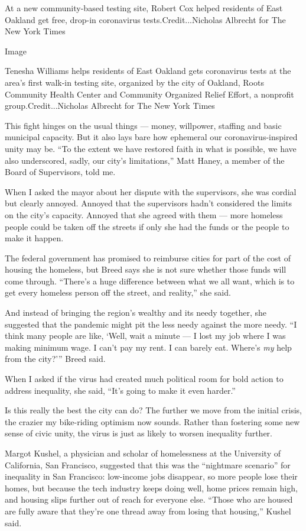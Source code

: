 At a new community-based testing site, Robert Cox helped residents of
East Oakland get free, drop-in coronavirus tests.Credit...Nicholas
Albrecht for The New York Times

Image

Tenesha Williams helps residents of East Oakland gets coronavirus tests
at the area's first walk-in testing site, organized by the city of
Oakland, Roots Community Health Center and Community Organized Relief
Effort, a nonprofit group.Credit...Nicholas Albrecht for The New York
Times

This fight hinges on the usual things --- money, willpower, staffing and
basic municipal capacity. But it also lays bare how ephemeral our
coronavirus-inspired unity may be. ``To the extent we have restored
faith in what is possible, we have also underscored, sadly, our city's
limitations,'' Matt Haney, a member of the Board of Supervisors, told
me.

When I asked the mayor about her dispute with the supervisors, she was
cordial but clearly annoyed. Annoyed that the supervisors hadn't
considered the limits on the city's capacity. Annoyed that she agreed
with them --- more homeless people could be taken off the streets if
only she had the funds or the people to make it happen.

The federal government has promised to reimburse cities for part of the
cost of housing the homeless, but Breed says she is not sure whether
those funds will come through. ``There's a huge difference between what
we all want, which is to get every homeless person off the street, and
reality,'' she said.

And instead of bringing the region's wealthy and its needy together, she
suggested that the pandemic might pit the less needy against the more
needy. ``I think many people are like, `Well, wait a minute --- I lost
my job where I was making minimum wage. I can't pay my rent. I can
barely eat. Where's \emph{my} help from the city?''' Breed said.

When I asked if the virus had created much political room for bold
action to address inequality, she said, ``It's going to make it even
harder.''

Is this really the best the city can do? The further we move from the
initial crisis, the crazier my bike-riding optimism now sounds. Rather
than fostering some new sense of civic unity, the virus is just as
likely to worsen inequality further.

Margot Kushel, a physician and scholar of homelessness at the University
of California, San Francisco, suggested that this was the ``nightmare
scenario'' for inequality in San Francisco: low-income jobs disappear,
so more people lose their homes, but because the tech industry keeps
doing well, home prices remain high, and housing slips further out of
reach for everyone else. ``Those who are housed are fully aware that
they're one thread away from losing that housing,'' Kushel said.

